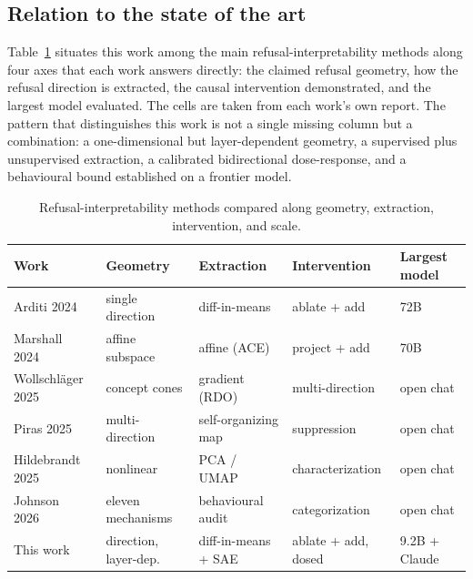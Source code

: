 
\subsection{Relation to the state of the art}
Table~\ref{tab:compare} situates this work among the main refusal-interpretability
methods along four axes that each work answers directly: the claimed refusal
geometry, how the refusal direction is extracted, the causal intervention
demonstrated, and the largest model evaluated. The cells are taken from each work's
own report. The pattern that distinguishes this work is not a single missing column
but a combination: a one-dimensional but layer-dependent geometry, a supervised plus
unsupervised extraction, a calibrated bidirectional dose-response, and a behavioural
bound established on a frontier model.

\begin{table}[h]
\caption{Refusal-interpretability methods compared along geometry, extraction,
intervention, and scale.}
\label{tab:compare}
\centering
\footnotesize
\setlength{\tabcolsep}{4pt}
\begin{tabular}{lllll}
\toprule
Work & Geometry & Extraction & Intervention & Largest model \\
\midrule
Arditi 2024~\cite{arditi2024refusal} & single direction & diff-in-means & ablate + add & 72B \\
Marshall 2024~\cite{marshall2024refusal} & affine subspace & affine (ACE) & project + add & 70B \\
Wollschl\"ager 2025~\cite{wollschlager2025geometry} & concept cones & gradient (RDO) & multi-direction & open chat \\
Piras 2025~\cite{piras2025som} & multi-direction & self-organizing map & suppression & open chat \\
Hildebrandt 2025~\cite{hildebrandt2025refusal} & nonlinear & PCA / UMAP & characterization & open chat \\
Johnson 2026~\cite{johnson2026more} & eleven mechanisms & behavioural audit & categorization & open chat \\
This work & direction, layer-dep.\ & diff-in-means + SAE & ablate + add, dosed & 9.2B + Claude \\
\bottomrule
\end{tabular}
\end{table}

